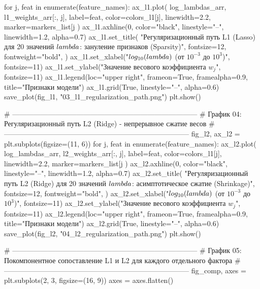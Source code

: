 \documentclass[14pt,a4paper]{extarticle}
\begin{document}
\begin{CodeListing}
for j, feat in enumerate(feature_names):
    ax_l1.plot(
        log_lambdas_arr, l1_weights_arr[:, j],
        label=feat, color=colors_l1[j], linewidth=2.2,
        marker=markers_list[j %
    )
ax_l1.axhline(0, color="black", linestyle="--", linewidth=1.2, alpha=0.7)
ax_l1.set_title(
    "Регуляризационный путь L1 (Lasso) для 20 значений $\\lambda$: зануление признаков (Sparsity)",
    fontsize=12,
    fontweight="bold",
)
ax_l1.set_xlabel("$\\log_{10}(\\lambda)$ (от $10^{-3}$ до $10^3$)", fontsize=11)
ax_l1.set_ylabel("Значение весового коэффициента $w_j$", fontsize=11)
ax_l1.legend(loc="upper right", frameon=True, framealpha=0.9, title="Признаки модели")
ax_l1.grid(True, linestyle="--", alpha=0.6)
save_plot(fig_l1, "03_l1_regularization_path.png")
plt.show()

# ------------------------------------------------------------------------------
# График 04: Регуляризационный путь L2 (Ridge) - непрерывное сжатие весов
# ------------------------------------------------------------------------------
fig_l2, ax_l2 = plt.subplots(figsize=(11, 6))
for j, feat in enumerate(feature_names):
    ax_l2.plot(
        log_lambdas_arr, l2_weights_arr[:, j],
        label=feat, color=colors_l1[j], linewidth=2.2,
        marker=markers_list[j %
    )
ax_l2.axhline(0, color="black", linestyle="--", linewidth=1.2, alpha=0.7)
ax_l2.set_title(
    "Регуляризационный путь L2 (Ridge) для 20 значений $\\lambda$: асимптотическое сжатие (Shrinkage)",
    fontsize=12,
    fontweight="bold",
)
ax_l2.set_xlabel("$\\log_{10}(\\lambda)$ (от $10^{-3}$ до $10^3$)", fontsize=11)
ax_l2.set_ylabel("Значение весового коэффициента $w_j$", fontsize=11)
ax_l2.legend(loc="upper right", frameon=True, framealpha=0.9, title="Признаки модели")
ax_l2.grid(True, linestyle="--", alpha=0.6)
save_plot(fig_l2, "04_l2_regularization_path.png")
plt.show()

# ------------------------------------------------------------------------------
# График 05: Покомпонентное сопоставление L1 и L2 для каждого отдельного фактора
# ------------------------------------------------------------------------------
fig_comp, axes = plt.subplots(2, 3, figsize=(16, 9))
axes = axes.flatten()


\end{CodeListing}
\end{document}
